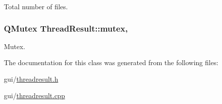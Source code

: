 Total number of files. 

\hypertarget{class_thread_result_a32543bd6b9a72184fc9ba7cec8a79eb1}{
\subsubsection[{mutex}]{\setlength{\rightskip}{0pt plus 5cm}Q\-Mutex Thread\-Result\-::mutex\hspace{0.3cm}{\ttfamily [mutable]}, {\ttfamily [protected]}}}\label{class_thread_result_a32543bd6b9a72184fc9ba7cec8a79eb1}


Mutex. 



The documentation for this class was generated from the following files\-:\begin{DoxyCompactItemize}
\item 
gui/\hyperlink{threadresult_8h}{threadresult.\-h}\item 
gui/\hyperlink{threadresult_8cpp}{threadresult.\-cpp}\end{DoxyCompactItemize}
